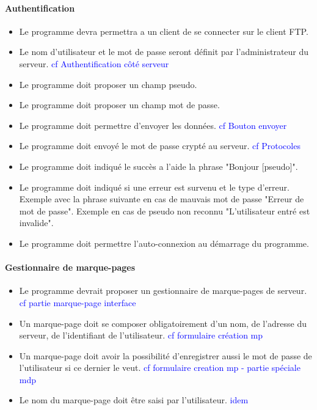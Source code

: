 \documentclass[10pt,a4paper]{report}
\begin{document}
\paragraph{Authentification}
	\begin{itemize}[label = $\triangleright$]
		\item Le programme devra permettra a un client de se connecter sur le client FTP.
		\item Le nom d'utilisateur et le mot de passe seront définit par l'administrateur du serveur. \textcolor{blue}{cf Authentification côté serveur}
		\item Le programme doit proposer un champ pseudo.
		\item Le programme doit proposer un champ mot de passe.
		\item Le programme doit permettre d'envoyer les données. \textcolor{blue}{cf Bouton envoyer}
		\item Le programme doit envoyé le mot de passe crypté au serveur. \textcolor{blue}{cf Protocoles}
		\item Le programme doit indiqué le succès a l'aide la phrase "Bonjour [pseudo]".
		\item Le programme doit indiqué si une erreur est survenu et le type d'erreur.
		\subitem Exemple avec la phrase suivante en cas de mauvais mot de passe "Erreur de mot de passe".
		\subitem Exemple en cas de pseudo non reconnu "L'utilisateur entré est invalide".
		\item Le programme doit permettre l'auto-connexion au démarrage du programme.
	\end{itemize}

\paragraph{Gestionnaire de marque-pages}
	\begin{itemize}[label = $\triangleright$]
		\item Le programme devrait proposer un gestionnaire de marque-pages de serveur. \textcolor{blue}{cf partie marque-page interface}
		\item Un marque-page doit se composer obligatoirement d'un nom, de l'adresse du serveur, de l'identifiant de l'utilisateur. \textcolor{blue}{cf formulaire création mp}
		\item Un marque-page doit avoir la possibilité d'enregistrer aussi le mot de passe de l'utilisateur si ce dernier le veut. \textcolor{blue}{cf formulaire creation mp - partie spéciale mdp}
		\item Le nom du marque-page doit être saisi par l'utilisateur. \textcolor{blue}{idem}
	\end{itemize}
	
\end{document}
